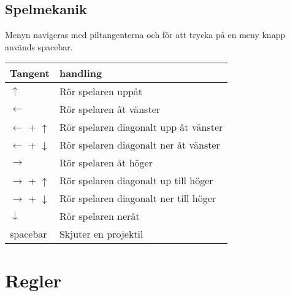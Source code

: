 \documentclass{TDP005mall}
\begin{document}
\subsection{Spelmekanik}
Menyn navigeras med piltangenterna och för att trycka på en meny knapp används spacebar.
\begin{table}[h]
\begin{tabularx}{\linewidth}{|l|X|}
\hline
  Tangent & handling \\\hline
  $\uparrow$ & Rör spelaren uppåt \\\hline
  $\leftarrow$ & Rör spelaren åt vänster \\\hline
  $\leftarrow$ + $\uparrow$ & Rör spelaren diagonalt upp åt vänster \\\hline
  $\leftarrow$ + $\downarrow$ & Rör spelaren diagonalt ner åt vänster \\\hline
  $\rightarrow$ & Rör spelaren åt höger \\\hline
  $\rightarrow$ + $\uparrow$ & Rör spelaren diagonalt up till höger \\\hline
  $\rightarrow$ + $\downarrow$ & Rör spelaren diagonalt ner till höger \\\hline
  $\downarrow$ & Rör spelaren neråt \\\hline
  spacebar & Skjuter en projektil \\\hline  
\end{tabularx}
\end{table}
\section{Regler}
\end{document}
